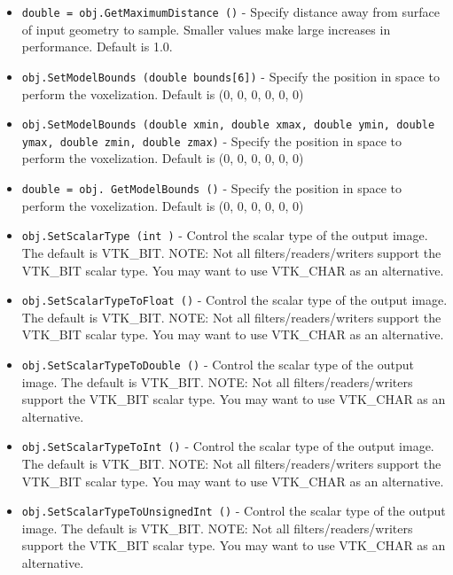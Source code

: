 \begin{itemize}
\item  \verb|double = obj.GetMaximumDistance ()| -  Specify distance away from surface of input geometry to sample. Smaller
 values make large increases in performance. Default is 1.0.

\item  \verb|obj.SetModelBounds (double bounds[6])| -  Specify the position in space to perform the voxelization.
 Default is (0, 0, 0, 0, 0, 0)

\item  \verb|obj.SetModelBounds (double xmin, double xmax, double ymin, double ymax, double zmin, double zmax)| -  Specify the position in space to perform the voxelization.
 Default is (0, 0, 0, 0, 0, 0)

\item  \verb|double = obj. GetModelBounds ()| -  Specify the position in space to perform the voxelization.
 Default is (0, 0, 0, 0, 0, 0)

\item  \verb|obj.SetScalarType (int )| -  Control the scalar type of the output image. The default is
 VTK\_BIT.
 NOTE: Not all filters/readers/writers support the VTK\_BIT
 scalar type. You may want to use VTK\_CHAR as an alternative.

\item  \verb|obj.SetScalarTypeToFloat ()| -  Control the scalar type of the output image. The default is
 VTK\_BIT.
 NOTE: Not all filters/readers/writers support the VTK\_BIT
 scalar type. You may want to use VTK\_CHAR as an alternative.

\item  \verb|obj.SetScalarTypeToDouble ()| -  Control the scalar type of the output image. The default is
 VTK\_BIT.
 NOTE: Not all filters/readers/writers support the VTK\_BIT
 scalar type. You may want to use VTK\_CHAR as an alternative.

\item  \verb|obj.SetScalarTypeToInt ()| -  Control the scalar type of the output image. The default is
 VTK\_BIT.
 NOTE: Not all filters/readers/writers support the VTK\_BIT
 scalar type. You may want to use VTK\_CHAR as an alternative.

\item  \verb|obj.SetScalarTypeToUnsignedInt ()| -  Control the scalar type of the output image. The default is
 VTK\_BIT.
 NOTE: Not all filters/readers/writers support the VTK\_BIT
 scalar type. You may want to use VTK\_CHAR as an alternative.


\end{itemize}
